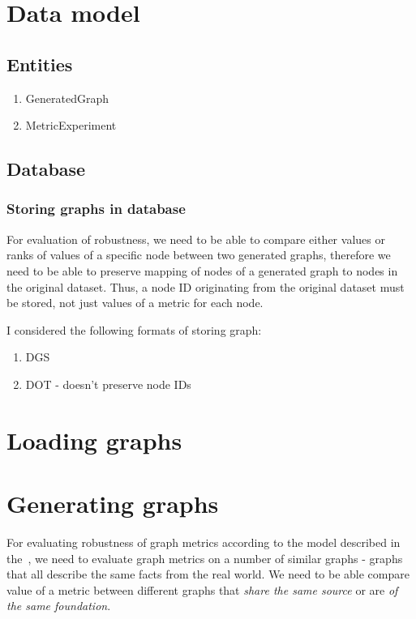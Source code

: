 \section{Data model}

\subsection{Entities}
\begin{enumerate}
    \item GeneratedGraph
    \item MetricExperiment
\end{enumerate}

\subsection{Database}

\subsubsection{Storing graphs in database}

For evaluation of robustness, we need to be able to compare either values or ranks of values of a specific node between two generated graphs, therefore we need to be able to preserve mapping of nodes of a generated graph to nodes in the original dataset.
Thus, a node ID originating from the original dataset must be stored, not just values of a metric for each node.

I considered the following formats of storing graph:
\begin{enumerate}
    \item DGS
    \item DOT - doesn't preserve node IDs
\end{enumerate}


\section{Loading graphs}


\section{Generating graphs}

For evaluating robustness of graph metrics according to the model described in the~, we need to evaluate graph metrics on a number of similar graphs - graphs that all describe the same facts from the real world.
We need to be able compare value of a metric between different graphs that \textit{share the same source} or are \textit{of the same foundation}.

